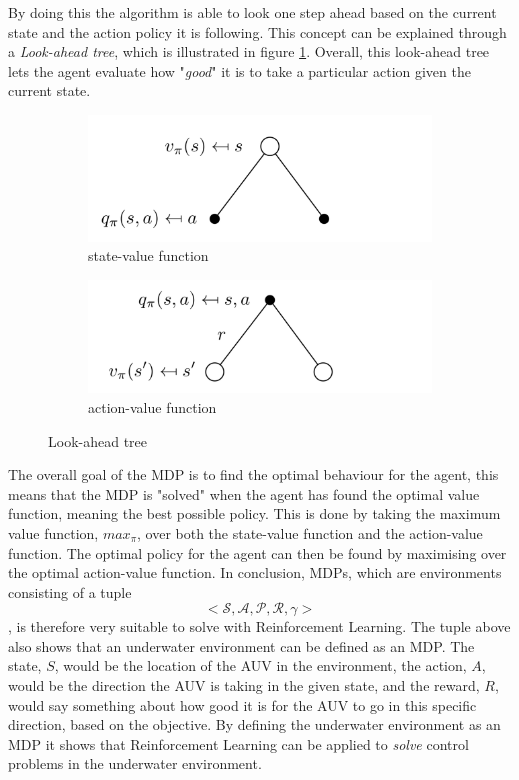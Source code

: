 By doing this the algorithm is able to look one step ahead based on the current state and the action policy it is following. This concept can be explained through a \textit{Look-ahead tree}, which is illustrated in figure \ref{fig:lookahead}. Overall, this look-ahead tree lets the agent evaluate how "\textit{good}" it is to take a particular action given the current state. 
\begin{figure}[H]
    \centering
    \begin{subfigure}[b]{0.45\textwidth}
        \centering
        \includegraphics[width=\textwidth]{images/chap2/look-ahead-value.png}
        \caption{state-value function}
    \end{subfigure}
    \hfill
    \begin{subfigure}[b]{0.45\textwidth}
        \centering
        \includegraphics[width=\textwidth]{images/chap2/look-ahead-action-value.png}
        \caption{action-value function}
    \end{subfigure}
    \caption{Look-ahead tree\cite{Silver}}
    \label{fig:lookahead}
\end{figure}
The overall goal of the MDP is to find the optimal behaviour for the agent, this means that the MDP is "solved" when the agent has found the optimal value function, meaning the best possible policy. This is done by taking the maximum value function, $max_{\pi}$, over both the state-value function and the action-value function. The optimal policy for the agent can then be found by maximising over the optimal action-value function. In conclusion, MDPs, which are environments consisting of a tuple $$<\mathcal{S, A, P, R, \gamma}>$$, is therefore very suitable to solve with Reinforcement Learning. The tuple above also shows that an underwater environment can be defined as an MDP. The state, $S$, would be the location of the AUV in the environment, the action, $A$, would be the direction the AUV is taking in the given state, and the reward, $R$, would say something about how good it is for the AUV to go in this specific direction, based on the objective. By defining the underwater environment as an MDP it shows that Reinforcement Learning can be applied to \textit{solve} control problems in the underwater environment.
